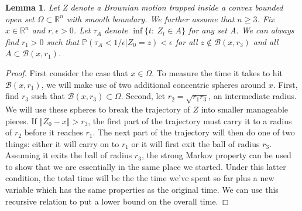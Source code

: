 \documentclass[12pt, nofootinbib,english, amsmath, amssymb, aps, priprint, graphicx,floatfix,draft]{revtex4-1}
\newtheorem{lemma}{Lemma}
\theoremstyle{plain}
\theoremstyle{definition}
\theoremstyle{plain}
\newcommand{\bb}[1]{\mathcal{B}\left(#1\right)}
\begin{document}
\begin{lemma}
\label{lem:longtime_diamater}
Let Z denote a Brownian motion trapped inside a convex bounded open set $\Omega\subset\mathbb{R}^{n}$ with smooth boundary.  We further assume that $n\geq3$. Fix $x\in\mathbb{R}^{n}$ and $r,\epsilon>0$. Let $\tau_{A}$ denote $\inf\{t:\ Z_{t}\in A\}$ for any set A. We can always find $r_1>0$ such that $\mathbb{P}(\tau_{A}<1/\epsilon|Z_{0}=z)<\epsilon$ for all $z\notin\bb{x,r_3}$ and all $A\subset\bb{x,r_1}$.
\end{lemma}
\begin{proof}
First consider the case that $x \in \Omega$.  To measure the time it takes to hit $\bb{x,r_1}$, we will make use of two additional concentric spheres around $x$.  First, find $r_3$ such that $\bb{x,r_3} \subset \Omega$.  Second, let $r_2 =\sqrt{r_1 r_3}$, an intermediate radius.    We will use these spheres to break the trajectory of $Z$ into smaller manageable pieces. If $\left\Vert Z_{0}-x\right\Vert >r_3$,
the first part of the trajectory must carry it to a radius of $r_2$ before it reaches $r_1$.
The next part of the trajectory will then do one of two things: either
it will carry on to $r_1$ or it will first exit the ball of radius
$r_3$. Assuming it exits the ball of radius $r_3$, the strong Markov
property can be used to show that we are essentially in the same place
we started. Under this latter condition, the total time will be the
the time we've spent so far plus a new variable which has the same
properties as the original time. We can use this recursive relation to put a lower
bound on the overall time.


\end{proof}
\end{document}
